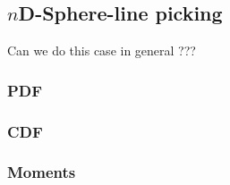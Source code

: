 \subsection{$n$D-Sphere-line picking}
\label{sec:nsphere_line}

Can we do this case in general ???

\subsubsection{PDF}

\subsubsection{CDF}


\subsubsection{Moments}
